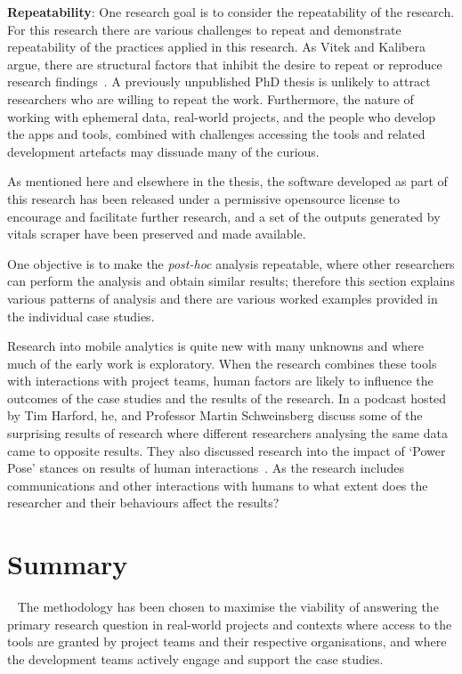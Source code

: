 \textbf{Repeatability}: One research goal is to consider the repeatability of the research. For this research there are various challenges to repeat and demonstrate repeatability of the practices applied in this research. As Vitek and Kalibera argue, there are structural factors that inhibit the desire to repeat or reproduce research findings~\citep[p.30]{vivek2012_r3_repeatability_reproducibility_and_rigor}. A previously unpublished PhD thesis is unlikely to attract researchers who are willing to repeat the work. Furthermore, the nature of working with ephemeral data, real-world projects, and the people who develop the apps and tools, combined with challenges accessing the tools and related development artefacts may dissuade many of the curious.

As mentioned here and elsewhere in the thesis, the software developed as part of this research has been released under a permissive opensource license to encourage and facilitate further research, and a set of the outputs generated by vitals scraper have been preserved and made available.

One objective is to make the \emph{post-hoc} analysis repeatable, where other researchers can perform the analysis and obtain similar results; therefore this section explains various patterns of analysis and there are various worked examples provided in the individual case studies.

Research into mobile analytics is quite new with many unknowns and where much of the early work is exploratory. When the research combines these tools with interactions with project teams, human factors are likely to influence the outcomes of the case studies and the results of the research. In a podcast hosted by Tim Harford, he, and Professor Martin Schweinsberg discuss some of the surprising results of research where different researchers analysing the same data came to opposite results. They also discussed research into the impact of `Power Pose' stances on results of human interactions~\citep{harford2021_more_or_less_same_data_opposite_results_can_we_trust_research}. As the research includes communications and other interactions with humans to what extent does the researcher and their behaviours affect the results?


\section[Summary of the methodology chapter]{Summary}~\label{methodology-summary-section}
The methodology has been chosen to maximise the viability of answering the primary research question in real-world projects and contexts where access to the tools are granted by project teams and their respective organisations, and where the development teams actively engage and support the case studies.

